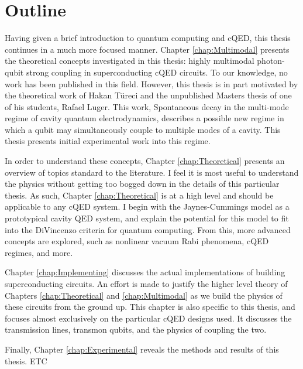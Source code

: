\documentclass[12 pt]{book}
\begin{document}
\section{Outline}
Having given a brief introduction to quantum computing and cQED, this thesis continues in a much more focused manner. Chapter \ref{chap:Multimodal} presents the theoretical concepts investigated in this thesis: highly multimodal photon-qubit strong coupling in superconducting cQED circuits. To our knowledge, no work has been published in this field. However, this thesis is in part motivated by the theoretical work of Hakan T\"{u}reci and the unpublished Masters thesis of one of his students, Rafael Luger\cite{Luger}. This work, Spontaneous decay in the multi-mode regime of cavity quantum electrodynamics, describes a possible new regime in which a qubit may simultaneously couple to multiple modes of a cavity. This thesis presents initial experimental work into this regime. 

In order to understand these concepts, Chapter \ref{chap:Theoretical} presents an overview of topics standard to the literature. I feel it is most useful to understand the physics without getting too bogged down in the details of this particular thesis. As such, Chapter \ref{chap:Theoretical} is at a high level and should be applicable to any cQED system. I begin with the Jaynes-Cummings model as a prototypical cavity QED system, and explain the potential for this model to fit into the DiVincenzo criteria for quantum computing. From this, more advanced concepts are explored, such as nonlinear vacuum Rabi phenomena, cQED regimes, and more. 

Chapter \ref{chap:Implementing} discusses the actual implementations of building superconducting circuits. An effort is made to justify the higher level theory of Chapters \ref{chap:Theoretical} and \ref{chap:Multimodal} as we build the physics of these circuits from the ground up. This chapter is also specific to this thesis, and focuses almost exclusively on the particular cQED designs used. It discusses the transmission lines, transmon qubits, and the physics of coupling the two. 

Finally, Chapter \ref{chap:Experimental} reveals the methods and results of this thesis. ETC



\end{document}
